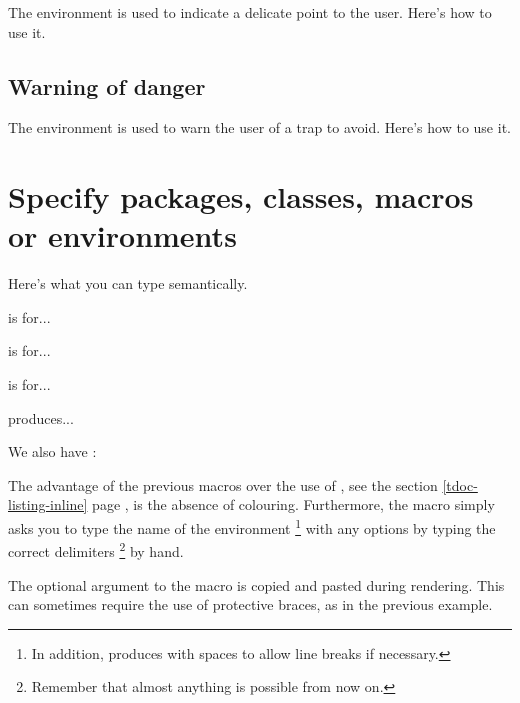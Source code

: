 The  environment is used to indicate a delicate point to the user. Here's how to use it.



\subsection{Warning of danger}

The  environment is used to warn the user of a trap to avoid. Here's how to use it.



\section{Specify packages, classes, macros or environments}

Here's what you can type semantically.


\begin{tdoclatex}[sbs]
 is for...

 is for...

 is for...

 produces...

We also have :

\end{tdoclatex}


\begin{tdocrem}
    The advantage of the previous macros over the use of , see the section \ref{tdoc-listing-inline} page \pageref{tdoc-listing-inline}, is the absence of colouring.
    Furthermore, the  macro simply asks you to type the name of the environment
    \footnote{
        In addition,  produces  with spaces to allow line breaks if necessary.
    }
    with any options by typing the correct delimiters
    \footnote{
        Remember that almost anything is possible from now on.
    }
    by hand.
\end{tdocrem}


\begin{tdocwarn}
    The optional argument to the  macro is copied and pasted during rendering. This can sometimes require the use of protective braces, as in the previous example.
\end{tdocwarn}


